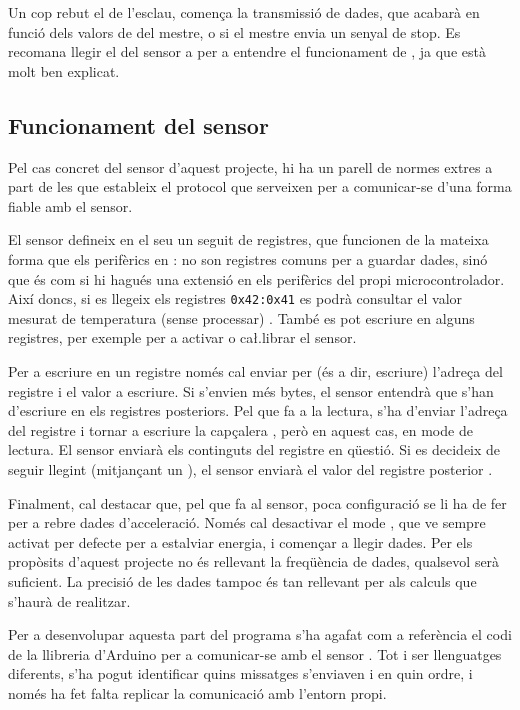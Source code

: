 Un cop rebut el  de l'esclau, comença la transmissió de
dades, que acabarà en funció dels valors de  del mestre, o
si el mestre envia un senyal de stop. Es recomana llegir el  del
sensor a \cite{mpu6050specs} per a entendre el funcionament de ,
ja que està molt ben explicat.

\subsection{Funcionament del sensor }

Pel cas concret del sensor d'aquest projecte, hi ha un parell de normes extres
a part de les que estableix el protocol  que serveixen per a comunicar-se
d'una forma fiable amb el sensor.

El sensor  defineix en el seu  un seguit de
registres, que funcionen de la mateixa forma que els perifèrics en :
no son registres comuns per a guardar dades, sinó que és com si hi hagués una
extensió en els perifèrics del propi microcontrolador. Així doncs, si es llegeix
els registres \texttt{0x42:0x41} es podrà consultar el valor mesurat de temperatura
(sense processar) \cite{MPU6050reg}. També es pot escriure en alguns registres,
per exemple per a activar o ca\l.librar el sensor.

Per a escriure en un registre només cal enviar per  (és a dir, escriure)
l'adreça del registre i el valor a escriure. Si s'envien més bytes, el sensor
entendrà que s'han d'escriure en els registres posteriors. Pel que fa a la lectura,
s'ha d'enviar l'adreça del registre i tornar a escriure la capçalera ,
però en aquest cas, en mode de lectura. El sensor enviarà els continguts del
registre en qüestió. Si es decideix de seguir llegint (mitjançant un ),
el sensor enviarà el valor del registre posterior \cite{mpu6050specs}.

Finalment, cal destacar que, pel que fa al sensor, poca configuració se li ha de
fer per a rebre dades d'acceleració. Només cal desactivar el mode ,
que ve sempre activat per defecte per a estalviar energia, i començar a llegir
dades. Per els propòsits d'aquest projecte no és rellevant la freqüència de
dades, qualsevol serà suficient. La precisió de les dades tampoc és tan rellevant
per als calculs que s'haurà de realitzar.

Per a desenvolupar aquesta part del programa s'ha agafat com a referència el
codi de la llibreria d'Arduino per a comunicar-se amb el sensor
\cite{mpu6050ino}. Tot i ser llenguatges diferents, s'ha pogut identificar
quins missatges  s'enviaven i en quin ordre, i només ha fet falta
replicar la comunicació amb l'entorn propi.

